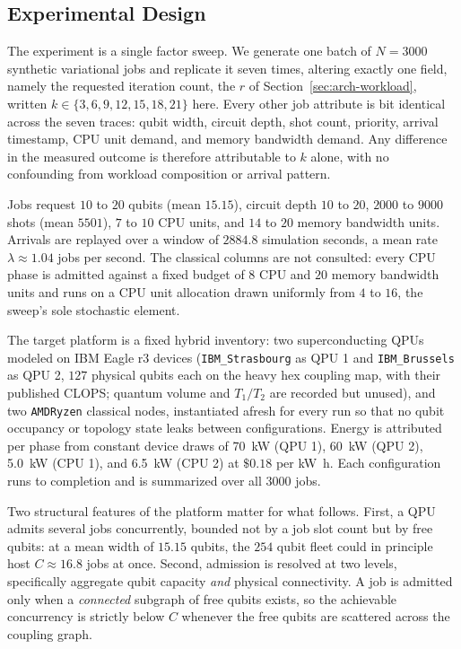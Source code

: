 \subsection{Experimental Design}
\label{sec:iter-setup}

The experiment is a single factor sweep. We generate one batch of $N=3000$ synthetic variational jobs and replicate it seven times, altering exactly one field, namely the requested iteration count, the $r$ of Section~\ref{sec:arch-workload}, written $k \in \{3,6,9,12,15,18,21\}$ here. Every other job attribute is bit identical across the seven traces: qubit width, circuit depth, shot count, priority, arrival timestamp, CPU unit demand, and memory bandwidth demand. Any difference in the measured outcome is therefore attributable to $k$ alone, with no confounding from workload composition or arrival pattern.

Jobs request $10$ to $20$ qubits (mean $15.15$), circuit depth $10$ to $20$, $2000$ to $9000$ shots (mean $5501$), $7$ to $10$ CPU units, and $14$ to $20$ memory bandwidth units. Arrivals are replayed over a window of $2884.8$ simulation seconds, a mean rate $\lambda \approx 1.04$ jobs per second. The classical columns are not consulted: every CPU phase is admitted against a fixed budget of $8$ CPU and $20$ memory bandwidth units and runs on a CPU unit allocation drawn uniformly from $4$ to $16$, the sweep's sole stochastic element.

The target platform is a fixed hybrid inventory: two superconducting QPUs modeled on IBM Eagle r3 devices (\texttt{IBM\_Strasbourg} as QPU 1 and \texttt{IBM\_Brussels} as QPU 2, $127$ physical qubits each on the heavy hex coupling map, with their published CLOPS; quantum volume and $T_1/T_2$ are recorded but unused), and two \texttt{AMDRyzen} classical nodes, instantiated afresh for every run so that no qubit occupancy or topology state leaks between configurations. Energy is attributed per phase from constant device draws of \qty{70}{\kilo\watt} (QPU 1), \qty{60}{\kilo\watt} (QPU 2), \qty{5.0}{\kilo\watt} (CPU 1), and \qty{6.5}{\kilo\watt} (CPU 2) at $\$0.18$ per \unit{\kilo\watt\hour}. Each configuration runs to completion and is summarized over all $3000$ jobs.

Two structural features of the platform matter for what follows. First, a QPU admits several jobs concurrently, bounded not by a job slot count but by free qubits: at a mean width of $15.15$ qubits, the $254$ qubit fleet could in principle host $C \approx 16.8$ jobs at once. Second, admission is resolved at two levels, specifically aggregate qubit capacity \emph{and} physical connectivity. A job is admitted only when a \emph{connected} subgraph of free qubits exists, so the achievable concurrency is strictly below $C$ whenever the free qubits are scattered across the coupling graph.

